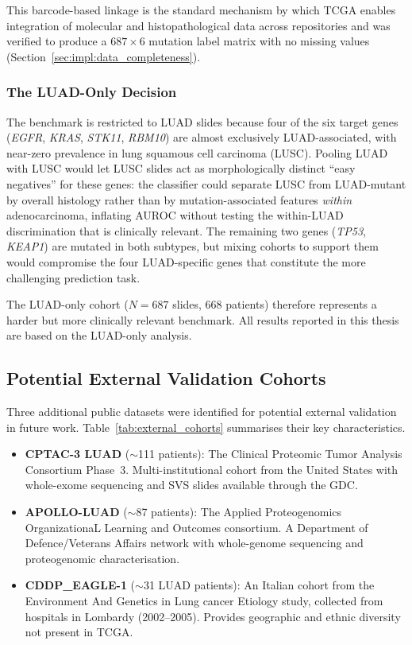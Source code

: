 This barcode-based linkage is the standard mechanism by which TCGA
enables integration of molecular and histopathological data across
repositories and was verified to produce a $687 \times 6$ mutation
label matrix with no missing values
(Section~\ref{sec:impl:data_completeness}).


\subsubsection{The LUAD-Only Decision}
\label{sec:uc:tcga:luad_only}

The benchmark is restricted to LUAD slides because four of the six
target genes (\textit{EGFR}, \textit{KRAS}, \textit{STK11},
\textit{RBM10}) are almost exclusively LUAD-associated, with near-zero
prevalence in lung squamous cell carcinoma (LUSC).
Pooling LUAD with LUSC would let LUSC slides act as morphologically
distinct ``easy negatives'' for these genes: the classifier could
separate LUSC from LUAD-mutant by overall histology rather than by
mutation-associated features \emph{within} adenocarcinoma, inflating
AUROC without testing the within-LUAD discrimination that is
clinically relevant.
The remaining two genes (\textit{TP53}, \textit{KEAP1}) are mutated
in both subtypes, but mixing cohorts to support them would compromise
the four LUAD-specific genes that constitute the more challenging
prediction task.

The LUAD-only cohort ($N = 687$ slides, 668 patients) therefore
represents a harder but more clinically relevant benchmark.
All results reported in this thesis are based on the LUAD-only
analysis.


\subsection{Potential External Validation Cohorts}
\label{sec:uc:external}

Three additional public datasets were identified for potential external
validation in future work.
Table~\ref{tab:external_cohorts} summarises their key characteristics.

\begin{itemize}
    \item \textbf{CPTAC-3 LUAD} ($\sim$111 patients): The Clinical
    Proteomic Tumor Analysis Consortium Phase~3. Multi-institutional
    cohort from the United States with whole-exome sequencing and SVS
    slides available through the GDC.

    \item \textbf{APOLLO-LUAD} ($\sim$87 patients): The Applied
    Proteogenomics OrganizationaL Learning and Outcomes consortium.
    A Department of Defence/Veterans Affairs network with whole-genome
    sequencing and proteogenomic characterisation.

    \item \textbf{CDDP\_EAGLE-1} ($\sim$31 LUAD patients): An Italian
    cohort from the Environment And Genetics in Lung cancer Etiology
    study, collected from hospitals in Lombardy (2002--2005).
    Provides geographic and ethnic diversity not present in TCGA.
\end{itemize}

